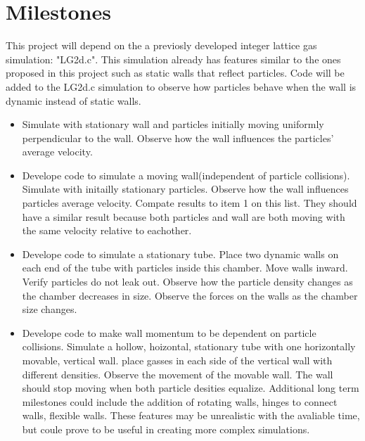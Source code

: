 \documentclass{article}
\begin{document}
\section{Milestones}
This project will depend on the a previosly developed integer lattice gas simulation: "LG2d.c". This simulation already has features similar to the ones proposed in this project such as static walls that reflect particles. Code will be added to the LG2d.c simulation to observe how particles behave when the wall is dynamic instead of static walls. 
\begin{itemize}
  \item Simulate with stationary wall and particles initially moving uniformly perpendicular to the wall. Observe how the wall influences the particles' average velocity.  
  \item Develope code to simulate a moving wall(independent of particle collisions). Simulate with initailly stationary particles. Observe how the wall influences particles average velocity. Compate results to item 1 on this list. They should have a similar result because both particles and wall are both moving with the same velocity relative to eachother.
  \item Develope code to simulate a stationary tube. Place two dynamic walls on each end of the tube with particles inside this chamber. Move walls inward. Verify particles do not leak out. Observe how the particle density changes as the chamber decreases in size. Observe the forces on the walls as the chamber size changes.
  \item Develope code to make wall momentum to be dependent on particle collisions. Simulate a hollow, hoizontal, stationary tube with one horizontally movable, vertical wall. place gasses in each side of the vertical wall with different densities. Observe the movement of the movable wall. The wall should stop moving when both particle desities equalize.\newline
\vspace{5mm}\newline
Additional long term milestones could include the addition of rotating walls, hinges to connect walls, flexible walls. These features may be unrealistic with the avaliable time, but coule prove to be useful in creating more complex simulations.
\end{itemize}
\end{document}
